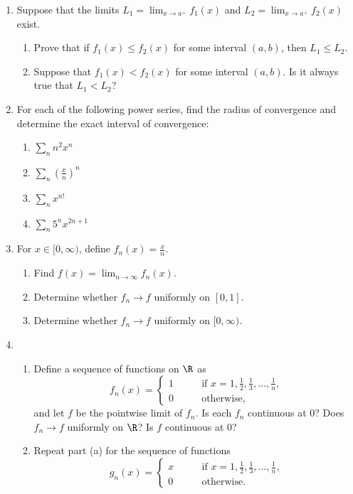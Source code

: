 \documentclass[12pt]{article}
\begin{document}
\begin{enumerate}
  \item Suppose that the limits $L_1 = \lim_{x\to a^+} f_1(x)$ and $L_2 = \lim_{x\to
    a^+} f_2(x)$ exist.
    \begin{enumerate}
      \item Prove that if $f_1(x) \le f_2(x)$ for some interval $(a,b)$, then
        $L_1\le L_2$.
      \item Suppose that $f_1(x) < f_2(x)$ for some interval $(a,b)$. Is it
        always true that $L_1 <L_2$?
    \end{enumerate}

  \item For each of the following power series, find the radius of convergence
    and determine the exact interval of convergence:
    \begin{enumerate}
      \item $\sum_n n^2 x^n$
      \item $\sum_n \left(\frac{x}{n}\right)^n$
      \item $\sum_n x^{n!}$
      \item $\sum_n 5^n x^{2n+1}$
    \end{enumerate}

  \item For $x\in [0,\infty)$, define $f_n(x) = \tfrac{x}{n}$.
    \begin{enumerate}
      \item Find $f(x) = \lim_{n\to\infty} f_n(x)$.
      \item Determine whether $f_n \to f$ uniformly on $[0,1]$.
      \item Determine whether $f_n \to f$ uniformly on $[0,\infty)$.
    \end{enumerate}

  \item
    \begin{enumerate}
      \item Define a sequence of functions on $\R$ as
        \begin{equation}
          f_n(x) = \begin{cases}
            1 & \qquad \text{if $x=1,\tfrac12,\tfrac13,\ldots,\tfrac1n$,} \\
            0 & \qquad \text{otherwise,}
          \end{cases}
        \end{equation}
        and let $f$ be the pointwise limit of $f_n$. Is each $f_n$ continuous at $0$? Does $f_n \to f$ uniformly on $\R$? Is $f$ continuous at 0?

      \item Repeat part (a) for the sequence of functions
        \begin{equation}
          g_n(x) = \begin{cases}
            x & \qquad \text{if $x=1,\tfrac12,\tfrac13,\ldots,\tfrac1n$,} \\
            0 & \qquad \text{otherwise.}
          \end{cases}
        \end{equation}
        
    \end{enumerate}
\end{enumerate}
\end{document}
